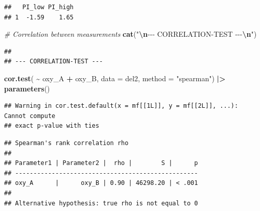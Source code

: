 \documentclass[
]{article}
\newenvironment{Shaded}{\begin{snugshade}}{\end{snugshade}}
\newcommand{\AttributeTok}[1]{\textcolor[rgb]{0.13,0.29,0.53}{#1}}
\newcommand{\CommentTok}[1]{\textcolor[rgb]{0.56,0.35,0.01}{\textit{#1}}}
\newcommand{\FunctionTok}[1]{\textcolor[rgb]{0.13,0.29,0.53}{\textbf{#1}}}
\newcommand{\NormalTok}[1]{#1}
\newcommand{\SpecialCharTok}[1]{\textcolor[rgb]{0.81,0.36,0.00}{\textbf{#1}}}
\newcommand{\StringTok}[1]{\textcolor[rgb]{0.31,0.60,0.02}{#1}}
\begin{document}
\begin{verbatim}
##   PI_low PI_high
## 1  -1.59    1.65
\end{verbatim}

\begin{Shaded}
\begin{Highlighting}[]
\CommentTok{\# Correlation between measurements}
\FunctionTok{cat}\NormalTok{(}\StringTok{"}\SpecialCharTok{\textbackslash{}n}\StringTok{{-}{-}{-} CORRELATION{-}TEST {-}{-}{-}}\SpecialCharTok{\textbackslash{}n}\StringTok{"}\NormalTok{)}
\end{Highlighting}
\end{Shaded}

\begin{verbatim}
## 
## --- CORRELATION-TEST ---
\end{verbatim}

\begin{Shaded}
\begin{Highlighting}[]
\FunctionTok{cor.test}\NormalTok{( }\SpecialCharTok{\textasciitilde{}}\NormalTok{ oxy\_A }\SpecialCharTok{+}\NormalTok{ oxy\_B, }\AttributeTok{data =}\NormalTok{ del2, }\AttributeTok{method =} \StringTok{"spearman"}\NormalTok{) }\SpecialCharTok{|\textgreater{}}
  \FunctionTok{parameters}\NormalTok{()}
\end{Highlighting}
\end{Shaded}

\begin{verbatim}
## Warning in cor.test.default(x = mf[[1L]], y = mf[[2L]], ...): Cannot compute
## exact p-value with ties
\end{verbatim}

\begin{verbatim}
## Spearman's rank correlation rho
## 
## Parameter1 | Parameter2 |  rho |        S |      p
## --------------------------------------------------
## oxy_A      |      oxy_B | 0.90 | 46298.20 | < .001
## 
## Alternative hypothesis: true rho is not equal to 0
\end{verbatim}
\end{document}
